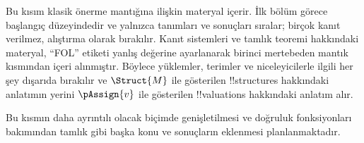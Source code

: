 


\begin{editorial}
  Bu kısım klasik önerme mantığına ilişkin materyal içerir. İlk bölüm
  görece başlangıç düzeyindedir ve yalnızca tanımları ve sonuçları sıralar;
  birçok kanıt verilmez, alıştırma olarak bırakılır. Kanıt sistemleri ve
  tamlık teoremi hakkındaki materyal, ``FOL'' etiketi yanlış değerine
  ayarlanarak birinci mertebeden mantık kısmından içeri alınmıştır. Böylece
  yüklemler, terimler ve niceleyicilerle ilgili her şey dışarıda bırakılır ve
  $\Struct{M}$ ile gösterilen !!{structure}s hakkındaki anlatımın yerini
  $\pAssign{v}$ ile gösterilen !!{valuation}s hakkındaki anlatım alır.

  Bu kısmın daha ayrıntılı olacak biçimde genişletilmesi ve doğruluk
  fonksiyonları bakımından tamlık gibi başka konu ve sonuçların eklenmesi
  planlanmaktadır.
\end{editorial}










\OLEndPartHook

